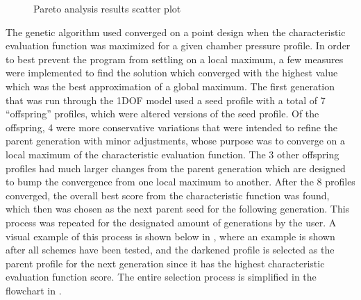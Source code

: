 \begin{figure}
    \centering
    \caption{Pareto analysis results scatter plot}
    \label{figure:pareto-points}
\end{figure}


The genetic algorithm used converged on a point design when the characteristic evaluation function was maximized for a given chamber pressure profile. In order to best prevent the program from settling on a local maximum, a few measures were implemented to find the solution which converged with the highest value which was the best approximation of a global maximum. The first generation that was run through the 1DOF model used a seed profile with a total of 7 ``offspring'' profiles, which were altered versions of the seed profile. Of the offspring, 4 were more conservative variations that were intended to refine the parent generation with minor adjustments, whose purpose was to converge on a local maximum of the characteristic evaluation function. The 3 other offspring profiles had much larger changes from the parent generation which are designed to bump the convergence from one local maximum to another. After the 8 profiles converged, the overall best score from the characteristic function was found, which then was chosen as the next parent seed for the following generation. This process was repeated for the designated amount of generations by the user. A visual example of this process is shown below in , where an example is shown after all schemes have been tested, and the darkened profile is selected as the parent profile for the next generation since it has the highest characteristic evaluation function score. The entire selection process is simplified in the flowchart in .

